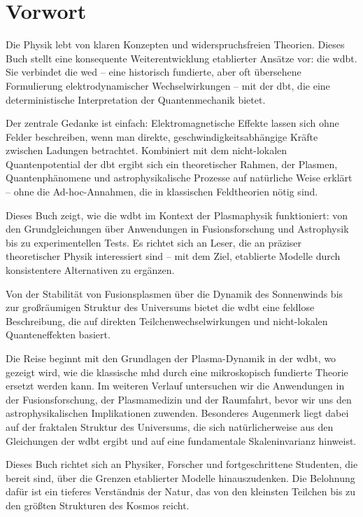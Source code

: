 \documentclass[11pt, a5paper, twoside, openright]{book}
\begin{document}
\chapter*{Vorwort}
Die Physik lebt von klaren Konzepten und widerspruchsfreien Theorien. Dieses Buch stellt eine konsequente Weiterentwicklung etablierter Ansätze vor: die \gls{wdbt}. Sie verbindet
die \gls{wed} – eine historisch fundierte, aber oft übersehene Formulierung elektrodynamischer Wechselwirkungen – mit der \gls{dbt}, die eine deterministische Interpretation der
Quantenmechanik bietet.

Der zentrale Gedanke ist einfach: Elektromagnetische Effekte lassen sich ohne Felder beschreiben, wenn man direkte, geschwindigkeitsabhängige Kräfte zwischen Ladungen betrachtet.
Kombiniert mit dem nicht-lokalen Quantenpotential der \gls{dbt} ergibt sich ein theoretischer Rahmen, der Plasmen, Quantenphänomene und astrophysikalische Prozesse auf natürliche
Weise erklärt – ohne die Ad-hoc-Annahmen, die in klassischen Feldtheorien nötig sind.

Dieses Buch zeigt, wie die \gls{wdbt} im Kontext der Plasmaphysik funktioniert: von den Grundgleichungen über Anwendungen in Fusionsforschung und Astrophysik bis zu experimentellen
Tests. Es richtet sich an Leser, die an präziser theoretischer Physik interessiert sind – mit dem Ziel, etablierte Modelle durch konsistentere Alternativen zu ergänzen.

Von der Stabilität von Fusionsplasmen über die Dynamik des Sonnenwinds bis zur großräumigen Struktur des Universums bietet die \gls{wdbt} eine feldlose Beschreibung, die auf direkten Teilchenwechselwirkungen und nicht-lokalen
Quanteneffekten basiert.

Die Reise beginnt mit den Grundlagen der Plasma-Dynamik in der \gls{wdbt}, wo gezeigt wird, wie die klassische \gls{mhd} durch eine mikroskopisch fundierte Theorie ersetzt werden
kann. Im weiteren Verlauf untersuchen wir die Anwendungen in der Fusionsforschung, der Plasmamedizin und der Raumfahrt, bevor wir uns den astrophysikalischen Implikationen zuwenden.
Besonderes Augenmerk liegt dabei auf der fraktalen Struktur des Universums, die sich natürlicherweise aus den Gleichungen der \gls{wdbt} ergibt und auf eine fundamentale
Skaleninvarianz hinweist.

Dieses Buch richtet sich an Physiker, Forscher und fortgeschrittene Studenten, die bereit sind, über die Grenzen etablierter Modelle hinauszudenken. Die Belohnung dafür ist ein
tieferes Verständnis der Natur, das von den kleinsten Teilchen bis zu den größten Strukturen des Kosmos reicht.
\end{document}
